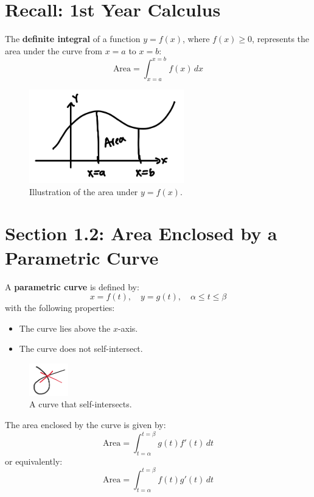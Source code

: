 \documentclass{article}
\begin{document}

\setcounter{page}{3}
\normalsize

\section*{Recall: 1st Year Calculus}
\begin{definitionbox}
The \textbf{definite integral} of a function \( y = f(x) \), where \( f(x) \geq 0 \), represents the area under the curve from \( x = a \) to \( x = b \):
\[
    \text{Area} = \int_{x=a}^{x=b} f(x) \, dx
\]
\begin{figure}[H]
    \centering
    \includegraphics[width=0.6\textwidth]{1styearcalc.jpg}
    \caption{Illustration of the area under \( y = f(x) \).}
    \label{fig:sample_image}
\end{figure}
\end{definitionbox}

\section*{Section 1.2: Area Enclosed by a Parametric Curve}
\begin{definitionbox}
A \textbf{parametric curve} is defined by:
\[
    x = f(t), \quad y = g(t), \quad \alpha \leq t \leq \beta
\]
with the following properties:
\begin{itemize}
    \item The curve lies above the \( x \)-axis.
    \item The curve does not self-intersect.
\end{itemize}
\begin{figure}[H]
    \centering
    \includegraphics[width=0.15\textwidth]{self_intersecting_parametric_curve_example.png}
    \caption{A curve that self-intersects.}
    \label{fig:sample_image}
\end{figure}

\begin{theorembox}
    The area enclosed by the curve is given by:
    \[
        \text{Area} = \int_{t=\alpha}^{t=\beta} g(t) f'(t) \, dt
    \]
    or equivalently:
    \[
        \text{Area} = \int_{t=\alpha}^{t=\beta} f(t) g'(t) \, dt
    \]
\end{theorembox}
\end{definitionbox}
\end{document}
